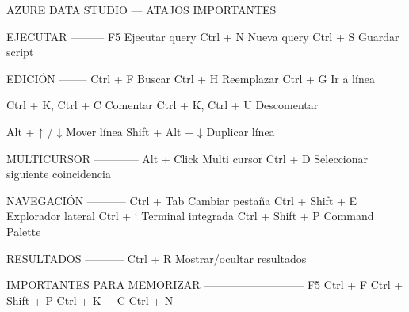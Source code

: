 AZURE DATA STUDIO — ATAJOS IMPORTANTES

EJECUTAR
---------
F5                 Ejecutar query
Ctrl + N           Nueva query
Ctrl + S           Guardar script

EDICIÓN
--------
Ctrl + F           Buscar
Ctrl + H           Reemplazar
Ctrl + G           Ir a línea

Ctrl + K, Ctrl + C     Comentar
Ctrl + K, Ctrl + U     Descomentar

Alt + ↑ / ↓        Mover línea
Shift + Alt + ↓    Duplicar línea

MULTICURSOR
------------
Alt + Click        Multi cursor
Ctrl + D           Seleccionar siguiente coincidencia

NAVEGACIÓN
-----------
Ctrl + Tab         Cambiar pestaña
Ctrl + Shift + E   Explorador lateral
Ctrl + `           Terminal integrada
Ctrl + Shift + P   Command Palette

RESULTADOS
-----------
Ctrl + R           Mostrar/ocultar resultados

IMPORTANTES PARA MEMORIZAR
---------------------------
F5
Ctrl + F
Ctrl + Shift + P
Ctrl + K + C
Ctrl + N